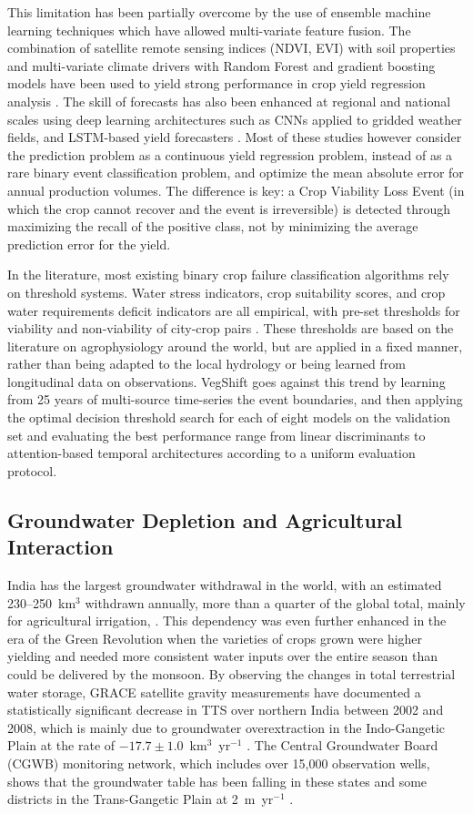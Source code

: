 \documentclass{ieeeaccess}
\begin{document}
This limitation has been partially overcome by the use of ensemble machine learning techniques which have allowed multi-variate feature fusion. The combination of satellite remote sensing indices (NDVI, EVI) with soil properties and multi-variate climate drivers with Random Forest and gradient boosting models have been used to yield strong performance in crop yield regression analysis \cite{crane2018,you2017}. The skill of forecasts has also been enhanced at regional and national scales using deep learning architectures such as CNNs applied to gridded weather fields, and LSTM-based yield forecasters \cite{wang2020}. Most of these studies however consider the prediction problem as a continuous yield regression problem, instead of as a rare binary event classification problem, and optimize the mean absolute error for annual production volumes. The difference is key: a Crop Viability Loss Event (in which the crop cannot recover and the event is irreversible) is detected through maximizing the recall of the positive class, not by minimizing the average prediction error for the yield.

In the literature, most existing binary crop failure classification algorithms rely on threshold systems. Water stress indicators, crop suitability scores, and crop water requirements deficit indicators are all empirical, with pre-set thresholds for viability and non-viability of city-crop pairs \cite{fao2023}. These thresholds are based on the literature on agrophysiology around the world, but are applied in a fixed manner, rather than being adapted to the local hydrology or being learned from longitudinal data on observations. VegShift goes against this trend by learning from 25 years of multi-source time-series the event boundaries, and then applying the optimal decision threshold search for each of eight models on the validation set and evaluating the best performance range from linear discriminants to attention-based temporal architectures according to a uniform evaluation protocol.

\subsection{Groundwater Depletion and Agricultural Interaction}
India has the largest groundwater withdrawal in the world, with an estimated 230--250~km$^3$ withdrawn annually, more than a quarter of the global total, mainly for agricultural irrigation, \cite{famiglietti2014}. This dependency was even further enhanced in the era of the Green Revolution when the varieties of crops grown were higher yielding and needed more consistent water inputs over the entire season than could be delivered by the monsoon. By observing the changes in total terrestrial water storage, GRACE satellite gravity measurements have documented a statistically significant decrease in TTS over northern India between 2002 and 2008, which is mainly due to groundwater overextraction in the Indo-Gangetic Plain at the rate of $-17.7 \pm 1.0$~km$^3$~yr$^{-1}$ \cite{rodell2009}. The Central Groundwater Board (CGWB) monitoring network, which includes over 15,000 observation wells, shows that the groundwater table has been falling in these states and some districts in the Trans-Gangetic Plain at 2~m~yr$^{-1}$ \cite{cgwb2022}.
\end{document}
